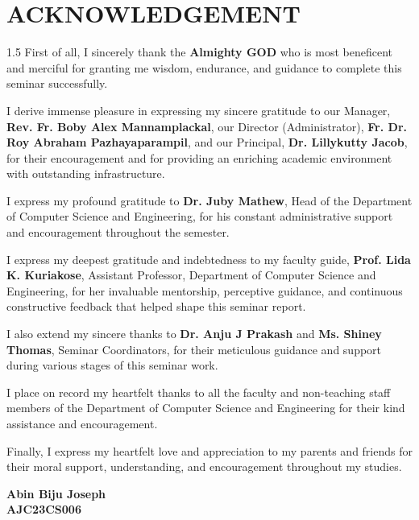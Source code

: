 \chapter*{ACKNOWLEDGEMENT}

\begin{spacing}{1.5}
First of all, I sincerely thank the \textbf{Almighty GOD} who is most beneficent and merciful for granting me wisdom, endurance, and guidance to complete this seminar successfully.

\smallskip
I derive immense pleasure in expressing my sincere gratitude to our Manager, \textbf{Rev. Fr. Boby Alex Mannamplackal}, our Director (Administrator), \textbf{Fr. Dr. Roy Abraham Pazhayaparampil}, and our Principal, \textbf{Dr. Lillykutty Jacob}, for their encouragement and for providing an enriching academic environment with outstanding infrastructure.

\smallskip
I express my profound gratitude to \textbf{Dr. Juby Mathew}, Head of the Department of Computer Science and Engineering, for his constant administrative support and encouragement throughout the semester.

\smallskip
I express my deepest gratitude and indebtedness to my faculty guide, \textbf{Prof. Lida K. Kuriakose}, Assistant Professor, Department of Computer Science and Engineering, for her invaluable mentorship, perceptive guidance, and continuous constructive feedback that helped shape this seminar report.

\smallskip
I also extend my sincere thanks to \textbf{Dr. Anju J Prakash} and \textbf{Ms. Shiney Thomas}, Seminar Coordinators, for their meticulous guidance and support during various stages of this seminar work.

\smallskip
I place on record my heartfelt thanks to all the faculty and non-teaching staff members of the Department of Computer Science and Engineering for their kind assistance and encouragement.

\smallskip
Finally, I express my heartfelt love and appreciation to my parents and friends for their moral support, understanding, and encouragement throughout my studies.

\vfill
\begin{flushright}
\textbf{Abin Biju Joseph}\\
\textbf{AJC23CS006}
\end{flushright}
\end{spacing}
